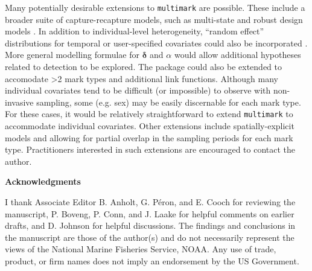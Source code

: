 \documentclass[12pt]{article}
\begin{document}
Many potentially desirable extensions to \verb|multimark| are possible. These include a broader suite of capture-recapture models, such as multi-state and robust design models \citep[e.g.][]{WilliamsEtAl2002}. In addition to individual-level heterogeneity, ``random effect'' distributions for temporal or user-specified covariates could also be incorporated \citep[e.g.][]{LaakeEtAl2013}. More general modelling formulae for ${\boldsymbol \delta}$ and $\alpha$ would allow additional hypotheses related to detection to be explored. The package could also be extended to accomodate >2 mark types and additional link functions. Although many individual covariates tend to be difficult (or impossible) to observe with non-invasive sampling, some (e.g. sex) may be easily discernable for each mark type. For these cases, it would be relatively straightforward to extend \verb|multimark| to accommodate individual covariates. Other extensions include spatially-explicit models \citep[e.g.][]{Royle2015} and allowing for partial overlap in the sampling periods for each mark type. Practitioners interested in such extensions are encouraged to contact the author.

\noindent \textbf{Acknowledgments} 

\noindent I thank Associate Editor B. Anholt, G. P\'{e}ron, and E. Cooch for reviewing the manuscript, P. Boveng, P. Conn, and J. Laake for helpful comments on earlier drafts, and D. Johnson for helpful discussions. The findings and conclusions in the manuscript are those of the author(s) and do not necessarily represent the views of the National Marine Fisheries Service, NOAA. Any use of trade, product, or firm names does not imply an endorsement by the US Government.




\clearpage
\end{document}

